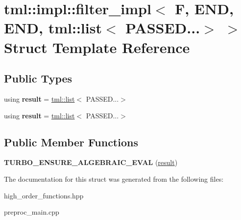 \hypertarget{structtml_1_1impl_1_1filter__impl_3_01F_00_01END_00_01END_00_01tml_1_1list_3_01PASSED_8_8_8_4_01_4}{\section{tml\+:\+:impl\+:\+:filter\+\_\+impl$<$ F, E\+N\+D, E\+N\+D, tml\+:\+:list$<$ P\+A\+S\+S\+E\+D...$>$ $>$ Struct Template Reference}
\label{structtml_1_1impl_1_1filter__impl_3_01F_00_01END_00_01END_00_01tml_1_1list_3_01PASSED_8_8_8_4_01_4}
}
\subsection*{Public Types}
\begin{DoxyCompactItemize}
\item 
\hypertarget{structtml_1_1impl_1_1filter__impl_3_01F_00_01END_00_01END_00_01tml_1_1list_3_01PASSED_8_8_8_4_01_4_aeabe8081dcc475577150f92cd4aefcc5}{using {\bfseries result} = \hyperlink{structtml_1_1list}{tml\+::list}$<$ P\+A\+S\+S\+E\+D...$>$}\label{structtml_1_1impl_1_1filter__impl_3_01F_00_01END_00_01END_00_01tml_1_1list_3_01PASSED_8_8_8_4_01_4_aeabe8081dcc475577150f92cd4aefcc5}

\item 
\hypertarget{structtml_1_1impl_1_1filter__impl_3_01F_00_01END_00_01END_00_01tml_1_1list_3_01PASSED_8_8_8_4_01_4_aeabe8081dcc475577150f92cd4aefcc5}{using {\bfseries result} = \hyperlink{structtml_1_1list}{tml\+::list}$<$ P\+A\+S\+S\+E\+D...$>$}\label{structtml_1_1impl_1_1filter__impl_3_01F_00_01END_00_01END_00_01tml_1_1list_3_01PASSED_8_8_8_4_01_4_aeabe8081dcc475577150f92cd4aefcc5}

\end{DoxyCompactItemize}
\subsection*{Public Member Functions}
\begin{DoxyCompactItemize}
\item 
\hypertarget{structtml_1_1impl_1_1filter__impl_3_01F_00_01END_00_01END_00_01tml_1_1list_3_01PASSED_8_8_8_4_01_4_a341486098f513bd848e0dd0c2322e873}{{\bfseries T\+U\+R\+B\+O\+\_\+\+E\+N\+S\+U\+R\+E\+\_\+\+A\+L\+G\+E\+B\+R\+A\+I\+C\+\_\+\+E\+V\+A\+L} (\hyperlink{structtml_1_1list}{result})}\label{structtml_1_1impl_1_1filter__impl_3_01F_00_01END_00_01END_00_01tml_1_1list_3_01PASSED_8_8_8_4_01_4_a341486098f513bd848e0dd0c2322e873}

\end{DoxyCompactItemize}


The documentation for this struct was generated from the following files\+:\begin{DoxyCompactItemize}
\item 
high\+\_\+order\+\_\+functions.\+hpp\item 
preproc\+\_\+main.\+cpp\end{DoxyCompactItemize}
